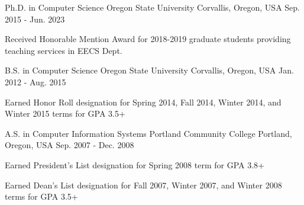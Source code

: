 

\begin{cventries}

  \cventry
    {Ph.D. in Computer Science} %
    {Oregon State University} %
    {Corvallis, Oregon, USA} %
    {Sep. 2015 - Jun. 2023} %
    {
      \begin{cvitems} %
        \item {Received Honorable Mention Award for 2018-2019 graduate students providing teaching services in EECS Dept.}
      \end{cvitems}
    }

  \cventry
    {B.S. in Computer Science} %
    {Oregon State University} %
    {Corvallis, Oregon, USA} %
    {Jan. 2012 - Aug. 2015} %
    {
      \begin{cvitems} %
        \item {Earned Honor Roll designation for Spring 2014, Fall 2014, Winter 2014, and Winter 2015 terms for GPA 3.5+}
      \end{cvitems}
    }

  \cventry
    {A.S. in Computer Information Systems} %
    {Portland Community College} %
    {Portland, Oregon, USA} %
    {Sep. 2007 - Dec. 2008} %
    {
      \begin{cvitems} %
        \item {Earned President's List designation for Spring 2008 term for GPA 3.8+}
        \item {Earned Dean's List designation for Fall 2007, Winter 2007, and Winter 2008 terms for GPA 3.5+}
      \end{cvitems}
    }
    
\end{cventries}

